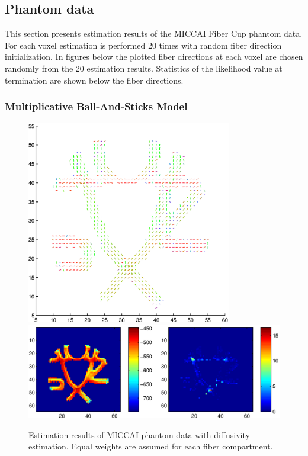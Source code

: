 \documentclass{article}
\begin{document}
\subsection{Phantom data}

This section presents estimation results of the MICCAI Fiber Cup phantom data. For each voxel estimation is performed 20 times with random fiber direction initialization. In figures below the plotted fiber directions at each voxel are chosen randomly from the 20 estimation results. Statistics of the likelihood value at termination are shown below the fiber directions.

\subsubsection{Multiplicative Ball-And-Sticks Model}

\begin{figure}[H]
  \caption{Estimation results of MICCAI phantom data with diffusivity estimation. Equal weights are assumed for each fiber compartment.}
  \centering
  \includegraphics[width=0.8\textwidth]{figures/phantom_modbas_diffus_dir.eps}
  \includegraphics[width=\textwidth]{figures/phantom_modbas_diffus_like.eps}
\end{figure}
\end{document}
